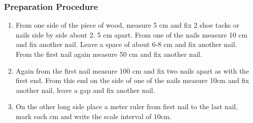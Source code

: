 \subsubsection*{Preparation Procedure}
\begin{enumerate}
\item{From one side of the piece of wood, measure 5 cm and fix 2 shoe tacks or nails side by side about 2.  5 cm apart. From one of the nails measure 10 cm and fix another nail. Leave a space of about 6-8 cm and fix another nail. From the first nail again measure 50 cm and fix another nail.} 
\item{Again from the first nail measure 100 cm and fix two nails apart as with the first end. From this end on the side of one of the nails measure 10cm and fix another nail, leave a gap and fix another nail.} 
\item{On the other long side place a meter ruler from first nail to the last nail, mark each cm and write the scale interval of 10cm.} 
\end{enumerate}

